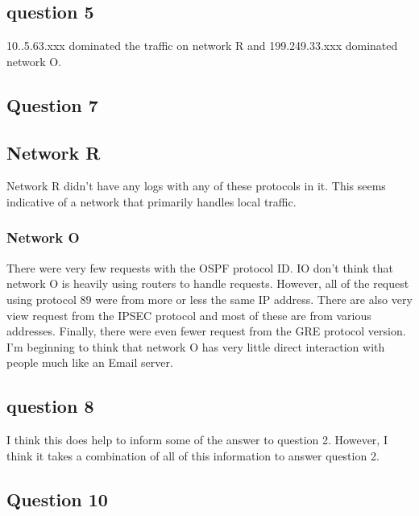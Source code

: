 \documentclass[letterpaper, onecolumn,10pt]{IEEEtran}
\begin{document}
	        \subsection{question 5}
	        10..5.63.xxx dominated the traffic on network R and 199.249.33.xxx dominated network O.\\
	        
	        \subsection{Question 7}
	        
	            \subsection{Network R}
	            Network R didn't have any logs with any of these protocols in it. This seems indicative of a network that primarily handles local traffic.\\
	        
	            \subsubsection{Network O}
	            There were very few requests with the OSPF protocol ID. IO don't think that network O is heavily using routers to handle requests. However, all of the request using protocol 89 were from more or less the same IP address. There are also very view request from the IPSEC protocol and most of these are from various addresses. Finally, there were even fewer request from the GRE protocol version. I'm beginning to think that network O has very little direct interaction with people much like an Email server.\\
	            
	       \subsection{question 8}
	       I think this does help to inform some of the answer to question 2. However, I think it takes a combination of all of this information to answer question 2.
	       
	       \subsection{Question 10}
\end{document}
